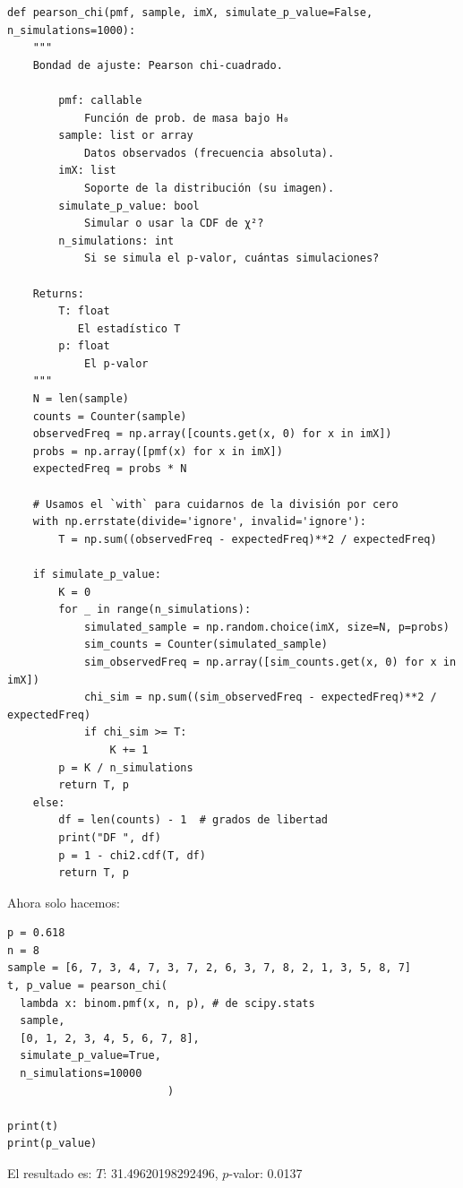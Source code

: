 \documentclass[a4paper, 12pt]{article}
\begin{document}
\tiny 
\begin{verbatim}
def pearson_chi(pmf, sample, imX, simulate_p_value=False, n_simulations=1000):
    """
    Bondad de ajuste: Pearson chi-cuadrado.
    
        pmf: callable
            Función de prob. de masa bajo H₀
        sample: list or array
            Datos observados (frecuencia absoluta).
        imX: list
            Soporte de la distribución (su imagen).
        simulate_p_value: bool
            Simular o usar la CDF de χ²?
        n_simulations: int
            Si se simula el p-valor, cuántas simulaciones?
            
    Returns:
        T: float
           El estadístico T 
        p: float
            El p-valor
    """
    N = len(sample)
    counts = Counter(sample)
    observedFreq = np.array([counts.get(x, 0) for x in imX])
    probs = np.array([pmf(x) for x in imX])
    expectedFreq = probs * N

    # Usamos el `with` para cuidarnos de la división por cero
    with np.errstate(divide='ignore', invalid='ignore'):
        T = np.sum((observedFreq - expectedFreq)**2 / expectedFreq)

    if simulate_p_value:
        K = 0
        for _ in range(n_simulations):
            simulated_sample = np.random.choice(imX, size=N, p=probs)
            sim_counts = Counter(simulated_sample)
            sim_observedFreq = np.array([sim_counts.get(x, 0) for x in imX])
            chi_sim = np.sum((sim_observedFreq - expectedFreq)**2 / expectedFreq)
            if chi_sim >= T:
                K += 1
        p = K / n_simulations
        return T, p
    else:
        df = len(counts) - 1  # grados de libertad
        print("DF ", df)
        p = 1 - chi2.cdf(T, df)
        return T, p

\end{verbatim}

\normalsize

Ahora solo hacemos:

\footnotesize 
\begin{verbatim}
p = 0.618
n = 8
sample = [6, 7, 3, 4, 7, 3, 7, 2, 6, 3, 7, 8, 2, 1, 3, 5, 8, 7]
t, p_value = pearson_chi(
  lambda x: binom.pmf(x, n, p), # de scipy.stats
  sample,
  [0, 1, 2, 3, 4, 5, 6, 7, 8],
  simulate_p_value=True,
  n_simulations=10000
                         )

print(t)
print(p_value)
\end{verbatim}

\normalsize
El resultado es: $T$: 31.49620198292496, $p$-valor: 0.0137
\end{document}
